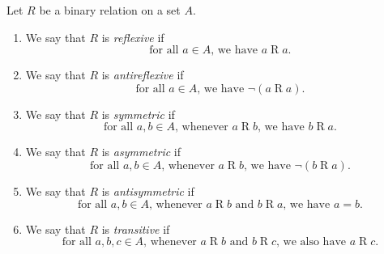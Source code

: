 \begin{definition}
  Let $R$ be a binary relation on a set $A$.
  \begin{enumerate}
  \item
    We say that $R$ is \emph{reflexive} if
    \[
      \text{for all $a\in A$, we have $a\mathrel{R} a$.}
    \]
  \item
    We say that $R$ is \emph{antireflexive} if
    \[
      \text{for all $a\in A$, we have $\neg(a\mathrel{R} a)$.}
    \]
  \item
    We say that $R$ is \emph{symmetric} if
    \[
      \text{for all $a, b\in A$, whenever $a\mathrel{R} b$, we have $b\mathrel{R} a$.}
    \]
  \item
    We say that $R$ is \emph{asymmetric} if
    \[
      \text{for all $a, b\in A$, whenever $a\mathrel{R} b$, we have $\neg(b\mathrel{R} a)$.}
    \]
  \item
    We say that $R$ is \emph{antisymmetric} if
    \[
      \text{for all $a, b\in A$, whenever $a\mathrel{R} b$ and $b\mathrel{R} a$, we have $a=b$.}
    \]
  \item
    We say that $R$ is \emph{transitive} if
    \[
      \text{for all $a, b, c\in A$, whenever $a\mathrel{R} b$ and $b\mathrel{R} c$, we also have $a\mathrel{R}c$.}
    \]
  \end{enumerate}

\end{definition}

